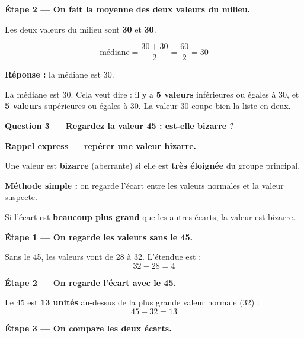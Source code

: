 \documentclass[12pt,a4paper]{article}
\begin{document}
\vspace{0.3cm}
\textbf{Étape 2 — On fait la moyenne des deux valeurs du milieu.}

Les deux valeurs du milieu sont \textbf{30} et \textbf{30}.

\[
\text{médiane} = \frac{30 + 30}{2} = \frac{60}{2} = 30
\]

\vspace{0.3cm}
\textbf{Réponse :} la médiane est $\boxed{30}$.

\begin{enclair}
La médiane est 30. Cela veut dire : il y a \textbf{5 valeurs} inférieures ou égales à 30, et \textbf{5 valeurs} supérieures ou égales à 30. La valeur 30 coupe bien la liste en deux.
\end{enclair}

\vspace{0.5cm}

\begin{correctionbox}
\textbf{Question 3 — Regardez la valeur 45 : est-elle bizarre ?}
\end{correctionbox}

\begin{rappelcible}
\textbf{Rappel express — repérer une valeur bizarre.}

\vspace{0.2cm}
Une valeur est \textbf{bizarre} (aberrante) si elle est \textbf{très éloignée} du groupe principal.

\vspace{0.2cm}
\textbf{Méthode simple :} on regarde l'écart entre les valeurs normales et la valeur suspecte.

\vspace{0.2cm}
Si l'écart est \textbf{beaucoup plus grand} que les autres écarts, la valeur est bizarre.
\end{rappelcible}

\vspace{0.3cm}
\textbf{Étape 1 — On regarde les valeurs sans le 45.}

Sans le 45, les valeurs vont de 28 à 32. L'étendue est :
\[
32 - 28 = 4
\]

\vspace{0.3cm}
\textbf{Étape 2 — On regarde l'écart avec le 45.}

Le 45 est \textbf{13 unités} au-dessus de la plus grande valeur normale (32) :
\[
45 - 32 = 13
\]

\vspace{0.3cm}
\textbf{Étape 3 — On compare les deux écarts.}
\end{document}
